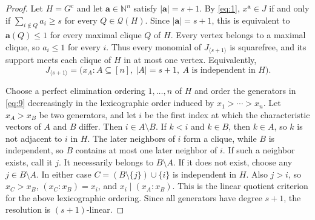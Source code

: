 \documentclass[10pt,a4paper]{amsart}
\newcommand{\NN}{\mathbb N}
\newcommand{\cQ}{\mathcal Q}
\begin{document}
\begin{proof}
Let $H=G^c$ and let $\mathbf a\in\NN^n$ satisfy $|\mathbf a|=s+1$. By \cref{eq:1}, $x^{\mathbf a}\in J$ if and only if $\sum_{i\notin Q}a_i\ge s$ for every $Q\in\cQ(H)$. Since $|\mathbf a|=s+1$, this is equivalent to $\mathbf a(Q)\le1$ for every maximal clique $Q$ of $H$. Every vertex belongs to a maximal clique, so $a_i\le1$ for every $i$. Thus every monomial of $J_{\langle s+1\rangle}$ is squarefree, and its support meets each clique of $H$ in at most one vertex. Equivalently,
\begin{equation}\label{eq:9}
J_{\langle s+1\rangle}
=
\bigl(x_A:A\subseteq[n],\ |A|=s+1,\ A\text{ is independent in }H\bigr).
\end{equation}

Choose a perfect elimination ordering $1,\ldots,n$ of $H$ and order the generators in \cref{eq:9} decreasingly in the lexicographic order induced by $x_1>\cdots>x_n$. Let $x_A>x_B$ be two generators, and let $i$ be the first index at which the characteristic vectors of $A$ and $B$ differ. Then $i\in A\setminus B$. If $k<i$ and $k\in B$, then $k\in A$, so $k$ is not adjacent to $i$ in $H$. The later neighbors of $i$ form a clique, while $B$ is independent, so $B$ contains at most one later neighbor of $i$. If such a neighbor exists, call it $j$. It necessarily belongs to $B\setminus A$. If it does not exist, choose any $j\in B\setminus A$. In either case $C=(B\setminus\{j\})\cup\{i\}$ is independent in $H$. Also $j>i$, so $x_C>x_B$, $(x_C:x_B)=x_i$, and $x_i\mid(x_A:x_B)$. This is the linear quotient criterion for the above lexicographic ordering. Since all generators have degree $s+1$, the resolution is $(s+1)$-linear.
\end{proof}
\end{document}
